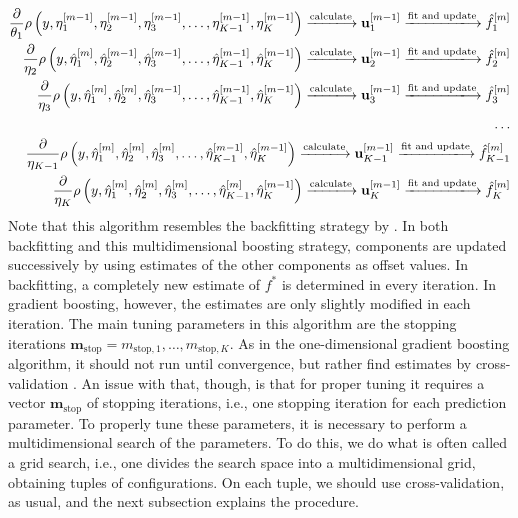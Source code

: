 \begin{align*}
    \frac{\partial}{\theta_1}\rho\left(y,\eta_1^{[m-1]},\eta_2^{[m-1]},\eta_3^{[m-1]},\ldots,\eta_{K-1}^{[m-1]},\eta_K^{[m-1]}\right)
    \xlongrightarrow{\text{calculate}}\u_{1}^{[m-1]}
    \xlongrightarrow{\text{fit and update}}\hat{f}_{1}^{[m]} \\
    \frac{\partial}{\eta_2}\rho\left(y,\hat{\eta}_1^{[m]},\hat{\eta}_2^{[m-1]},\hat{\eta}_3^{[m-1]},\ldots,\hat{\eta}_{K-1}^{[m-1]},\hat{\eta}_K^{[m-1]}\right)
    \xlongrightarrow{\text{calculate}} \u_{2}^{[m-1]}
    \xlongrightarrow{\text{fit and update}}\hat{f}_{2}^{[m]} \\
    \frac{\partial}{\eta_3}\rho\left(y,\hat{\eta}_1^{[m]},\hat{\eta}_2^{[m]},\hat{\eta}_3^{[m-1]},\ldots,\hat{\eta}_{K-1}^{[m-1]},\hat{\eta}_K^{[m-1]}\right)
    \xlongrightarrow{\text{calculate}}\u_{3}^{[m-1]}
    \xlongrightarrow{\text{fit and update}}\hat{f}_{3}^{[m]} \\
    \ldots\\
    \frac{\partial}{\eta_{K-1}}\rho\left(y,\hat{\eta}_1^{[m]},\hat{\eta}_2^{[m]},\hat{\eta}_3^{[m]},\ldots,\hat{\eta}_{K-1}^{[m-1]},\hat{\eta}_K^{[m-1]}\right)
    \xlongrightarrow{\text{calculate}}\u_{K-1}^{[m-1]}
    \xlongrightarrow{\text{fit and update}}\hat{f}_{K-1}^{[m]} \\
    \frac{\partial}{\eta_K}\rho\left(y,\hat{\eta}_1^{[m]},\hat{\eta}_2^{[m]},\hat{\eta}_3^{[m]},\ldots,\hat{\eta}_{K-1}^{[m]},\hat{\eta}_K^{[m-1]}\right)
    \xlongrightarrow{\text{calculate}}\u_{K}^{[m-1]}
    \xlongrightarrow{\text{fit and update}}\hat{f}_{K}^{[m]}
\end{align*}
Note that this algorithm resembles the backfitting strategy by \citet{hastie1986}.
In both backfitting and this multidimensional boosting strategy, components are updated successively by using estimates of the other components as offset values.
In backfitting, a completely new estimate of $f^*$ is determined in every iteration.
In gradient boosting, however, the estimates are only slightly modified in each iteration.
The main tuning parameters in this algorithm are the stopping iterations $\mathbf{m}_{\text{stop}}=m_{\text{stop},1},\ldots,m_{\text{stop},K}$.
As in the one-dimensional gradient boosting algorithm, it should not run until convergence, but rather find estimates by cross-validation \citep{schmid}.
An issue with that, though, is that for proper tuning it requires a vector $\mathbf{m}_{\text{stop}}$ of stopping iterations, i.e., one stopping iteration for each prediction parameter. To properly tune these parameters, it is necessary to perform a multidimensional search of the parameters. To do this, we do what is often called a grid search, i.e., one divides the search space into a multidimensional grid, obtaining tuples of configurations. On each tuple, we should use cross-validation, as usual, and the next subsection explains the procedure.
